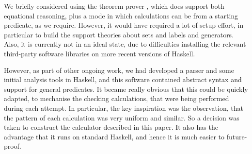 We briefly considered using the  theorem prover
\cite{DBLP:conf/utp/Butterfield10,DBLP:conf/utp/Butterfield12},
which does support both equational reasoning,
plus a mode in which calculations can be from a starting predicate,
as we require.
However, it would have required a lot of setup effort,
in particular to build the support theories about sets and labels
and generators.
Also, it is currently not in an ideal state,
due to difficulties installing
the relevant third-party software libraries
on more recent versions of Haskell.

However, as part of other ongoing work,
we had developed a parser and some initial analysis tools
in Haskell\cite{Haskell2010},
and this software contained abstract syntax and support
for general predicates.
It became really obvious that this could be quickly adapted,
to mechanise the checking calculations, that were being performed
during each attempt.
In particular,
the key inspiration was the observation,
that the pattern of each calculation was very uniform and similar.
So a decision was taken to construct the calculator described in this paper.
It also has the advantage that it runs on standard Haskell,
and hence it is much easier to future-proof.
